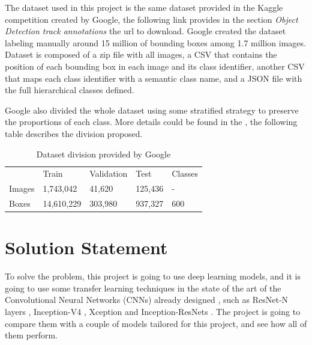\documentclass[11pt, a4paper, twocolumn]{article}
\begin{document}
The dataset used in this project is the same dataset provided in the Kaggle competition created by Google, the following link \cite{datasets} provides in the section {\itshape Object Detection track annotations} the url to download. Google created the dataset labeling manually around 15 million of bounding boxes among 1.7 million images. Dataset is composed of a zip file with all images, a CSV that contains the position of each bounding box in each image and its class identifier, another CSV that maps each class identifier with a semantic class name, and a JSON file with the full hierarchical classes defined.

Google also divided the whole dataset using some stratified strategy to preserve the proportions of each class. More details could be found in the \cite{imgdataset}, the following table describes the division proposed.

\begin{table}[ht]
	\footnotesize
	\centering
	\caption{ \small Dataset division provided by Google }
	\label{table1}
	\begin{tabular}{@{}p{1.5cm}p{1.5cm}p{1.5cm}p{1.5cm}p{1.2cm}@{}}
		\rowcolor[HTML]{EFEFEF}
		& \multicolumn{1}{l}{\cellcolor[HTML]{EFEFEF}Train} & \multicolumn{1}{l}{\cellcolor[HTML]{EFEFEF}Validation} & \multicolumn{1}{l}{\cellcolor[HTML]{EFEFEF}Test} & \multicolumn{1}{l}{\cellcolor[HTML]{EFEFEF}Classes} \\
		Images & 1,743,042                                         & 41,620                                                 & 125,436                                          & -                                                      \\
		Boxes  & 14,610,229                                        & 303,980                                                & 937,327                                          & 600                                                    \\
	\end{tabular}
\end{table}

\section{Solution Statement}

To solve the problem, this project is going to use deep learning models, and it is going to use some transfer learning techniques in the state of the art of the Convolutional Neural Networks (CNNs) already designed \cite{cnns}, such as ResNet-N layers \cite{resnet}, Inception-V4 \cite{inception}, Xception \cite{xception} and Inception-ResNets \cite{inception}. The project is going to compare them with a couple of models tailored for this project, and see how all of them perform.
\end{document}
